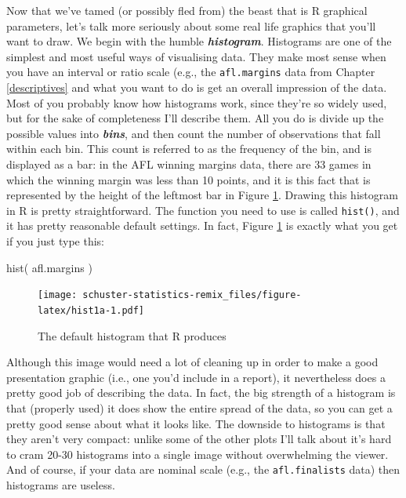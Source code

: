 \documentclass[
]{book}
\newenvironment{Shaded}{\begin{snugshade}}{\end{snugshade}}
\newcommand{\FunctionTok}[1]{\textcolor[rgb]{0.00,0.00,0.00}{#1}}
\newcommand{\NormalTok}[1]{#1}
\begin{document}
Now that we've tamed (or possibly fled from) the beast that is R graphical parameters, let's talk more seriously about some real life graphics that you'll want to draw. We begin with the humble \textbf{\emph{histogram}}. Histograms are one of the simplest and most useful ways of visualising data. They make most sense when you have an interval or ratio scale (e.g., the \texttt{afl.margins} data from Chapter \ref{descriptives} and what you want to do is get an overall impression of the data. Most of you probably know how histograms work, since they're so widely used, but for the sake of completeness I'll describe them. All you do is divide up the possible values into \textbf{\emph{bins}}, and then count the number of observations that fall within each bin. This count is referred to as the frequency of the bin, and is displayed as a bar: in the AFL winning margins data, there are 33 games in which the winning margin was less than 10 points, and it is this fact that is represented by the height of the leftmost bar in Figure \ref{fig:hist1a}. Drawing this histogram in R is pretty straightforward. The function you need to use is called \texttt{hist()}, and it has pretty reasonable default settings. In fact, Figure \ref{fig:hist1a} is exactly what you get if you just type this:

\begin{Shaded}
\begin{Highlighting}[]
\FunctionTok{hist}\NormalTok{( afl.margins )}
\end{Highlighting}
\end{Shaded}

\begin{figure}
\centering
\texttt{[image: schuster-statistics-remix\_files/figure-latex/hist1a-1.pdf]}
\caption{\label{fig:hist1a}The default histogram that R produces}
\end{figure}

Although this image would need a lot of cleaning up in order to make a good presentation graphic (i.e., one you'd include in a report), it nevertheless does a pretty good job of describing the data. In fact, the big strength of a histogram is that (properly used) it does show the entire spread of the data, so you can get a pretty good sense about what it looks like. The downside to histograms is that they aren't very compact: unlike some of the other plots I'll talk about it's hard to cram 20-30 histograms into a single image without overwhelming the viewer. And of course, if your data are nominal scale (e.g., the \texttt{afl.finalists} data) then histograms are useless.
\end{document}
